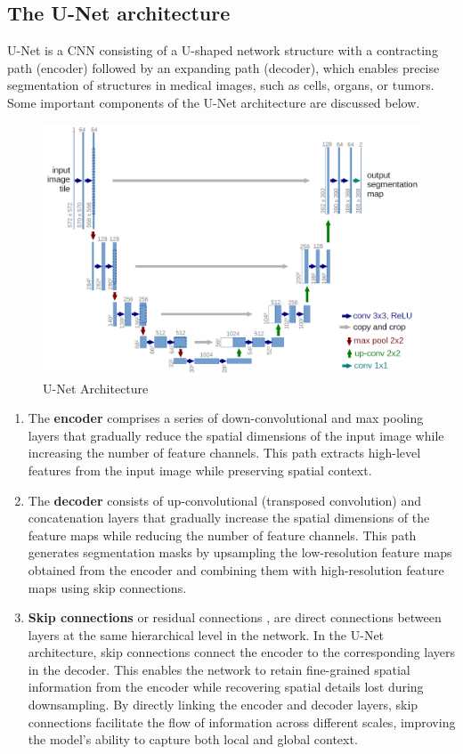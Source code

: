 \subsection{The U-Net architecture}
U-Net \cite{unet} is a CNN consisting of a U-shaped network structure with a contracting path (encoder) followed by an expanding path (decoder), which enables precise segmentation of structures in medical images, such as cells, organs, or tumors. Some important components of the U-Net architecture are discussed below. 
\begin{figure}[ht]
    \centering
    \includegraphics[width=12cm]{images/Theory-DL/UNet.png}
    \caption{U-Net Architecture \cite{unet}}
    \label{fig:UNet}
\end{figure}
\begin{enumerate}
  \item The \textbf{encoder} comprises a series of down-convolutional and max pooling layers that gradually reduce the spatial dimensions of the input image while increasing the number of feature channels. This path extracts high-level features from the input image while preserving spatial context.
  \item The \textbf{decoder} consists of up-convolutional (transposed convolution) and concatenation layers that gradually increase the spatial dimensions of the feature maps while reducing the number of feature channels. This path generates segmentation masks by upsampling the low-resolution feature maps obtained from the encoder and combining them with high-resolution feature maps using skip connections.
  \item \textbf{Skip connections} or residual connections \cite{he2016deep}, are direct connections between layers at the same hierarchical level in the network. In the U-Net architecture, skip connections connect the encoder to the corresponding layers in the decoder. This enables the network to retain fine-grained spatial information from the encoder while recovering spatial details lost during downsampling. By directly linking the encoder and decoder layers, skip connections facilitate the flow of information across different scales, improving the model's ability to capture both local and global context.
\end{enumerate}
